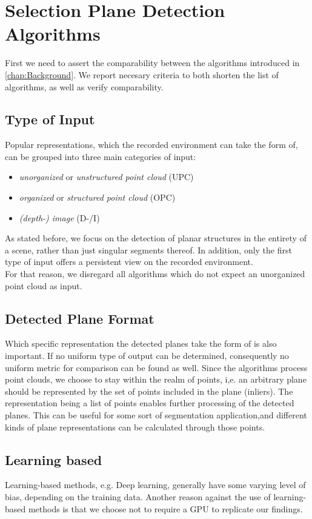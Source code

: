 \documentclass[main.tex]{subfiles}
\begin{document}
\section{Selection Plane Detection Algorithms}
First we need to assert the comparability between the algorithms introduced in \ref{chap:Background}.
We report necesary criteria to both shorten the list of algorithms, as well as verify comparability.

\subsection*{Type of Input}
Popular representations, which the recorded environment can take the form of, can be grouped into three main categories of input:
\begin{itemize}
    \item \textit{unorganized} or \textit{unstructured point cloud} (UPC)
    \item \textit{organized} or \textit{structured point cloud} (OPC)
    \item \textit{(depth-) image} (D-/I)
\end{itemize}

As stated before, we focus on the detection of planar structures in the entirety of a scene, rather than just singular segments thereof.
In addition, only the first type of input offers a persistent view on the recorded environment.\\
For that reason, we disregard all algorithms which do not expect an unorganized point cloud as input.


\subsection*{Detected Plane Format}
Which specific representation the detected planes take the form of is also important.
If no uniform type of output can be determined, consequently no uniform metric for comparison can be found as well.
Since the algorithms process point clouds, we choose to stay within the realm of points, i,e. an arbitrary plane should be
represented by the set of points included in the plane (inliers).
The representation being a list of points enables further processing of the detected planes.
This can be useful for some sort of segmentation application,and different kinds of plane representations can be calculated through those points.

\subsection*{Learning based}\label{subsec_learning_based}
Learning-based methods, e.g. Deep learning, generally have some varying level of bias, depending on the training data.
Another reason against the use of learning-based methods is that we choose not to require a GPU to replicate our findings.
\end{document}
